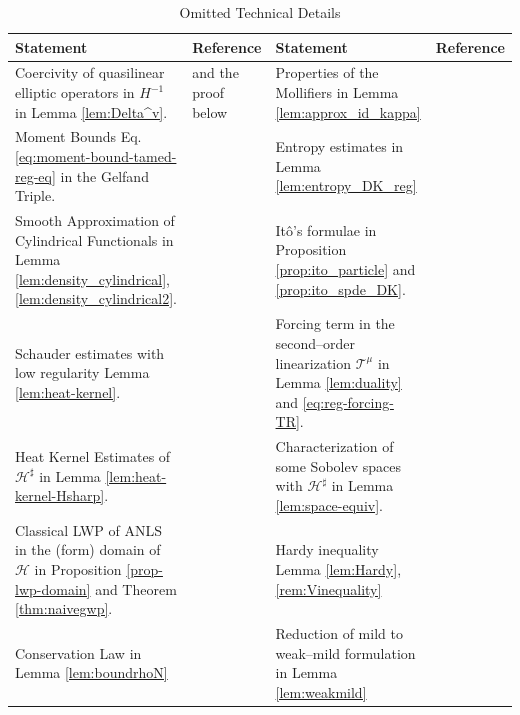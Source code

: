 {\footnotesize
\renewcommand{\arraystretch}{1.7}
\begin{longtable}{|m{3.6cm}|m{3.2cm}!{\vrule width 1pt}m{3.6cm}|m{3.2cm}|}
\hline
\textbf{Statement} & \textbf{Reference} & \textbf{Statement} & \textbf{Reference} \\
\hline
\endfirsthead
\endhead
\endfoot
\caption{Omitted Technical Details}
\label{tab:omit}
\endlastfoot
Coercivity of quasilinear elliptic operators in $H^{-1}$ in Lemma \ref{lem:Delta^v}.
& \cite[Lemma A.1]{djurdjevac2025weak} and the proof below
& Properties of the Mollifiers in Lemma \ref{lem:approx_id_kappa}
& \cite[Lemma A.2]{djurdjevac2025weak} \\
\hline
Moment Bounds Eq. \eqref{eq:moment-bound-tamed-reg-eq} in the Gelfand Triple.
& \cite[Section A.2]{djurdjevac2025weak}
& Entropy estimates in Lemma \ref{lem:entropy_DK_reg}
& \cite[Lemma 3.2]{djurdjevac2025weak} \\
\hline
Smooth Approximation of Cylindrical Functionals in Lemma \ref{lem:density_cylindrical}, \ref{lem:density_cylindrical2}.
& \cite[Lemma 3.3 \& Section A.3.2]{djurdjevac2025weak}
& It\^o's formulae in Proposition \ref{prop:ito_particle} and \ref{prop:ito_spde_DK}.
& \cite[Proposition 3.5 \& 3.6]{djurdjevac2025weak} \\
\hline
Schauder estimates  with low regularity Lemma \ref{lem:heat-kernel}.
& \cite[Lemma 4.3]{djurdjevac2025weak}
& Forcing term in the second--order linearization $\mathcal{T}^{\mu}$ in Lemma \ref{lem:duality} and \ref{eq:reg-forcing-TR}.
& \cite[Eq. (A.36) \& Lemma A.8]{djurdjevac2025weak} \\
\hline
Heat Kernel Estimates of $\mathcal{H}^{\sharp}$ in Lemma \ref{lem:heat-kernel-Hsharp}.
& \cite[Lemma 2.12 \& B.1]{de2025stochastic}
& Characterization of some Sobolev spaces with 
$\mathcal{H}^{\sharp}$ in Lemma \ref{lem:space-equiv}. & \cite[Lemma 3.5]{de2025stochastic} \\
\hline
Classical LWP of ANLS in the (form) domain of $\mathcal{H}$ in Proposition \ref{prop-lwp-domain} and Theorem \ref{thm:naivegwp}.
& \cite[Proposition 4.1, Theorem 5.3]{de2025stochastic}
& Hardy inequality Lemma \ref{lem:Hardy}, \ref{rem:Vinequality} & \cite[Lemma 6.6 \& 6.7]{de2025stochastic} \\
\hline
Conservation Law in Lemma \ref{lem:boundrhoN}
& \cite[Lemma 6.9]{de2025stochastic}
& Reduction of mild to weak--mild formulation in Lemma \ref{lem:weakmild}
& \cite[Lemma 6.13]{de2025stochastic} \\
\hline
\end{longtable}
}

